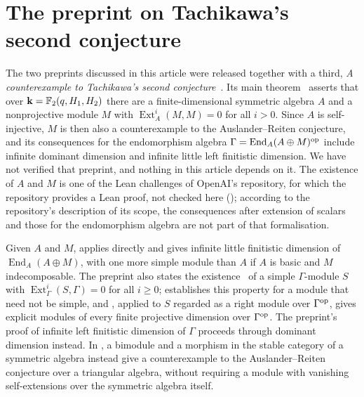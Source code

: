 \section{The preprint on Tachikawa's second conjecture}
\label{app:companion}

The two preprints discussed in this article were released together with a
third, \emph{A counterexample to Tachikawa's second
conjecture}~\cite{OAI26tachikawa}. Its main
theorem~\cite[Theorem~1.1]{OAI26tachikawa}
asserts that over
${\mathbf{k}=\mathbb{F}_2(q,H_1,H_2)}$ there are a finite-dimensional symmetric algebra
$A$ and a nonprojective module $M$ with ${\operatorname{Ext}^i_A(M,M)=0}$ for all
${i>0}$. Since $A$ is self-injective, $M$ is then also a counterexample to the
Auslander--Reiten conjecture, and its consequences for the endomorphism
algebra ${\Gamma=\operatorname{End}_A(A\oplus M)^{\mathrm{op}}}$ include infinite
dominant dimension and infinite little left finitistic dimension. We have not
verified that preprint, and nothing in this article depends on it.
The existence of $A$ and $M$ is one of the Lean challenges of OpenAI's
repository, for which the repository provides a Lean proof, not checked here
(); according to the
repository's description of its scope, the consequences after extension of
scalars and those for the endomorphism algebra are not part of that
formalisation.

Given $A$ and $M$,
 applies directly and gives infinite little finitistic
dimension of ${\operatorname{End}_A(A\oplus M)}$, with one more simple module than
$A$ if $A$ is basic and $M$ indecomposable. The preprint also states the
existence~\cite[Corollary~1.2(2)]{OAI26tachikawa} of a simple
$\Gamma$-module $S$ with ${\operatorname{Ext}^i_\Gamma(S,\Gamma)=0}$ for all
${i\geq0}$;  establishes this property for a module that
need not be simple, and , applied
to $S$ regarded as a right module over $\Gamma^{\mathrm{op}}$, gives explicit modules
of every finite projective dimension over $\Gamma^{\mathrm{op}}$. The preprint's proof
of
infinite left finitistic dimension of $\Gamma$ proceeds through dominant
dimension instead. In , a bimodule and a morphism in the
stable category of a symmetric algebra instead give a counterexample to the
Auslander--Reiten conjecture over a triangular algebra, without requiring a
module with vanishing self-extensions over the symmetric algebra itself.
